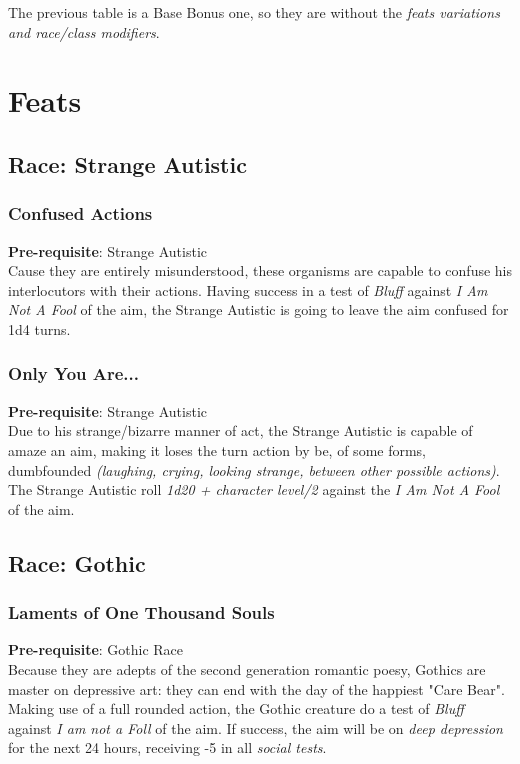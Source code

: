 \documentclass[ letterpaper,12pt]{article}
\begin{document}
{The previous table is a Base Bonus one, so they are without the {\it feats variations and race/class modifiers}.\\

\section{Feats}

\subsection{Race: Strange Autistic}

\subsubsection{Confused Actions}
{\bf Pre-requisite}: Strange Autistic\\
Cause they are entirely misunderstood, these organisms are capable to confuse his interlocutors with their actions. Having success in a test of {\it Bluff} against {\it I Am Not A Fool} of the aim, the Strange Autistic is going to leave the aim confused for 1d4 turns.

\subsubsection{Only You Are...}
 {\bf Pre-requisite}: Strange Autistic\\
Due to his strange/bizarre manner of act, the Strange Autistic is capable of amaze an aim, making it loses the turn action by be, of some forms, dumbfounded {\it (laughing, crying, looking strange, between other possible actions)}.  The Strange Autistic roll {\it 1d20 + character level/2} against the {\it I Am Not A Fool} of the aim.

\subsection{Race: Gothic}

\subsubsection{Laments of One Thousand Souls}
{\bf Pre-requisite}: Gothic Race\\
Because they are adepts of the second generation romantic poesy, Gothics are master on depressive art: they can end with the day of the happiest "Care Bear". Making use of a full rounded action, the Gothic creature do a test of {\it Bluff} against {\it I am not a Foll} of the aim. If success, the aim will be on {\it deep depression} for the next 24 hours, receiving -5 in all {\it social tests}.

}
\end{document}
